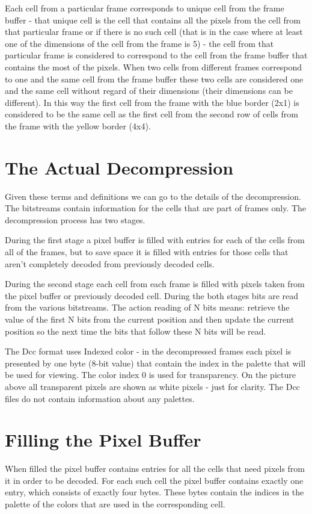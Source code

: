 	
Each cell from a particular frame corresponds to unique cell from the frame 
buffer - that unique cell is the cell that contains all the pixels from the cell 
from that particular frame or if there is no such cell (that is in the case 
where at least one of the dimensions of the cell from the frame is 5) - the cell 
from that particular frame is considered to correspond to the cell from the 
frame buffer that contains the most of the pixels. When two cells from different 
frames correspond to one and the same cell from the frame buffer these two cells 
are considered one and the same cell without regard of their dimensions (their 
dimensions can be different). In this way the first cell from the frame with the 
blue border (2x1) is considered to be the same cell as the first cell from the 
second row of cells from the frame with the yellow border (4x4).

\newpage
\section{The Actual Decompression}
Given these terms and definitions we can go to the details of the decompression. 
The bitstreams contain information for the cells that are part of frames only. 
The decompression process has two stages. 

During the first stage a pixel buffer is filled with entries for each of the 
cells from all of the frames, but to save space it is filled with entries for 
those cells that aren't completely decoded from previously decoded cells. 

During the second stage each cell from each frame is filled with pixels taken 
from the pixel buffer or previously decoded cell. During the both stages bits 
are read from the various bitstreams. The action reading of N bits means: 
retrieve the value of the first N bits from the current position and then update 
the current position so the next time the bits that follow these N bits will be 
read.

The Dcc format uses Indexed color - in the decompressed frames each pixel is 
presented by one byte (8-bit value) that contain the index in the palette that 
will be used for viewing. The color index 0 is used for transparency. On the 
picture above all transparent pixels are shown as white pixels - just for 
clarity. The Dcc files do not contain information about any palettes.

\section{Filling the Pixel Buffer}
When filled the pixel buffer contains entries for all the cells that need pixels 
from it in order to be decoded. For each such cell the pixel buffer contains 
exactly one entry, which consists of exactly four bytes. These bytes contain the 
indices in the palette of the colors that are used in the corresponding cell. 

